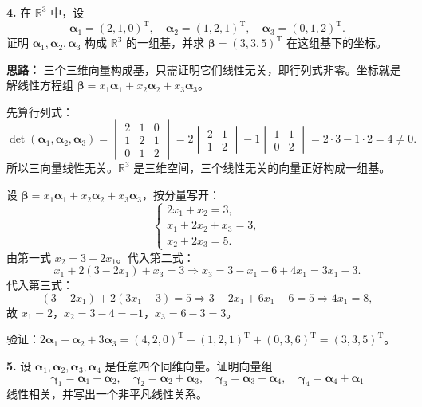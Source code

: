 \textbf{4.} 在 $\mathbb{R}^3$ 中，设
\[
\boldsymbol{\alpha}_1=(2,1,0)^\mathrm{T},\quad
\boldsymbol{\alpha}_2=(1,2,1)^\mathrm{T},\quad
\boldsymbol{\alpha}_3=(0,1,2)^\mathrm{T}.
\]
证明 $\boldsymbol{\alpha}_1,\boldsymbol{\alpha}_2,\boldsymbol{\alpha}_3$ 构成 $\mathbb{R}^3$ 的一组基，并求 $\boldsymbol{\beta}=(3,3,5)^\mathrm{T}$ 在这组基下的坐标。

\ifshowsolutions%
\quad
\textbf{思路：} 三个三维向量构成基，只需证明它们线性无关，即行列式非零。坐标就是解线性方程组 $\boldsymbol{\beta}=x_1\boldsymbol{\alpha}_1+x_2\boldsymbol{\alpha}_2+x_3\boldsymbol{\alpha}_3$。

先算行列式：
\[
\det(\boldsymbol{\alpha}_1,\boldsymbol{\alpha}_2,\boldsymbol{\alpha}_3)
=\begin{vmatrix}
2&1&0\\
1&2&1\\
0&1&2
\end{vmatrix}
=2\begin{vmatrix}2&1\\1&2\end{vmatrix}
-1\begin{vmatrix}1&1\\0&2\end{vmatrix}
=2\cdot 3-1\cdot 2=4\neq 0.
\]
所以三向量线性无关。$\mathbb{R}^3$ 是三维空间，三个线性无关的向量正好构成一组基。

设 $\boldsymbol{\beta}=x_1\boldsymbol{\alpha}_1+x_2\boldsymbol{\alpha}_2+x_3\boldsymbol{\alpha}_3$，按分量写开：
\[
\begin{cases}
2x_1+x_2=3,\\
x_1+2x_2+x_3=3,\\
x_2+2x_3=5.
\end{cases}
\]
由第一式 $x_2=3-2x_1$。代入第二式：
\[
x_1+2(3-2x_1)+x_3=3
\Longrightarrow x_3=3-x_1-6+4x_1=3x_1-3.
\]
代入第三式：
\[
(3-2x_1)+2(3x_1-3)=5
\Longrightarrow 3-2x_1+6x_1-6=5
\Longrightarrow 4x_1=8,
\]
故 $x_1=2$，$x_2=3-4=-1$，$x_3=6-3=3$。

验证：$2\boldsymbol{\alpha}_1-\boldsymbol{\alpha}_2+3\boldsymbol{\alpha}_3=(4,2,0)^\mathrm{T}-(1,2,1)^\mathrm{T}+(0,3,6)^\mathrm{T}=(3,3,5)^\mathrm{T}$。

\else \answerarea[8] \fi%

\textbf{5.} 设 $\boldsymbol{\alpha}_1,\boldsymbol{\alpha}_2,\boldsymbol{\alpha}_3,\boldsymbol{\alpha}_4$ 是任意四个同维向量。证明向量组
\[
\boldsymbol{\gamma}_1=\boldsymbol{\alpha}_1+\boldsymbol{\alpha}_2,\quad
\boldsymbol{\gamma}_2=\boldsymbol{\alpha}_2+\boldsymbol{\alpha}_3,\quad
\boldsymbol{\gamma}_3=\boldsymbol{\alpha}_3+\boldsymbol{\alpha}_4,\quad
\boldsymbol{\gamma}_4=\boldsymbol{\alpha}_4+\boldsymbol{\alpha}_1
\]
线性相关，并写出一个非平凡线性关系。

